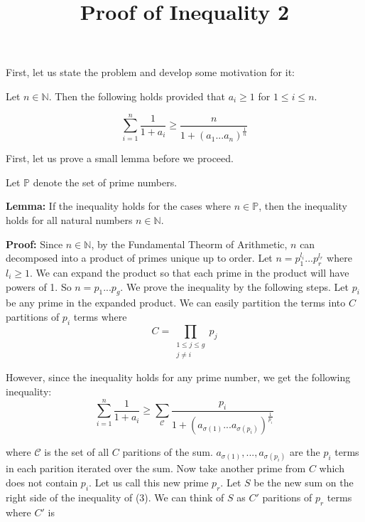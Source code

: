 \documentclass[11pt]{article}
\title{Proof of Inequality 2}
\author{\Name}
\begin{document}
\maketitle

First, let us state the problem and develop some motivation for it: \newline

Let $n \in \mathbb{N}$. Then the following holds provided that $a_i \geq 1$ for $1 \leq i \leq n$.

\begin{equation}
 \sum_{i=1}^{n} \frac{1}{1 + a_i} \geq \frac{n}{1 + (a_1...a_n)^{\frac{1}{n}}}
\end{equation}

First, let us prove a small lemma before we proceed. \newline

Let $\mathbb{P}$ denote the set of prime numbers. \newline

\textbf{Lemma:} If the inequality holds for the cases where $n \in \mathbb{P}$, then the inequality holds for all natural numbers $n \in \mathbb{N}$. \newline

\textbf{Proof:} Since $n \in \mathbb{N}$, by the Fundamental Theorm of Arithmetic, $n$ can decomposed into a product of primes unique up to order. Let $n = p_1^{l_i}...p_r^{l_r}$ where $l_i \geq 1$. We can expand the product so that each prime in the product will have powers of 1.
So $n = p_1...p_g$. We prove the inequality by the following steps. Let $p_i$ be any prime in the expanded product. We can easily partition the terms into $C$ partitions of $p_i$ terms where 
\begin{equation}
  C = \prod_{\substack{1 \leq j \leq g \\ j \neq i}} p_j
\end{equation}

However, since the inequality holds for any prime number, we get the following inequality:
\begin{equation}
 \sum_{i=1}^{n} \frac{1}{1 + a_i} \geq \sum_{\mathcal{C}} \frac{p_i}{1 + ( a_{\sigma(1)}...a_{\sigma(p_i)} )^{\frac{1}{p_i}}}
\end{equation}

where $\mathcal{C}$ is the set of all $C$ paritions of the sum. $a_{\sigma(1)},...,a_{\sigma(p_i)}$ are the $p_i$ terms in each parition iterated over the sum. Now take another prime from $C$ which does not contain $p_i$. Let us call this new prime $p_r$.
Let $S$ be the new sum on the right side of the inequality of (3). We can think of $S$ as $C'$ paritions of $p_r$ terms where $C'$ is 
\end{document}
